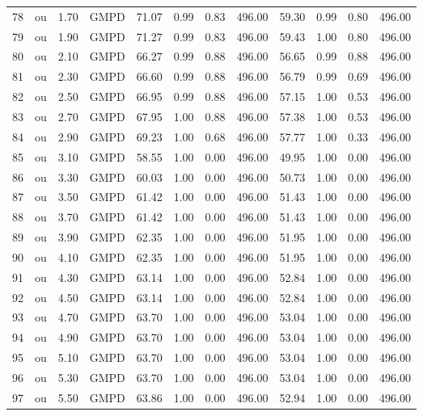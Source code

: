 \begin{table}[ht]
\begin{tabular}{rlrlrrrrrrrr}
  78 & ou & 1.70 & GMPD & 71.07 & 0.99 & 0.83 & 496.00 & 59.30 & 0.99 & 0.80 & 496.00 \\ 
  79 & ou & 1.90 & GMPD & 71.27 & 0.99 & 0.83 & 496.00 & 59.43 & 1.00 & 0.80 & 496.00 \\ 
  80 & ou & 2.10 & GMPD & 66.27 & 0.99 & 0.88 & 496.00 & 56.65 & 0.99 & 0.88 & 496.00 \\ 
  81 & ou & 2.30 & GMPD & 66.60 & 0.99 & 0.88 & 496.00 & 56.79 & 0.99 & 0.69 & 496.00 \\ 
  82 & ou & 2.50 & GMPD & 66.95 & 0.99 & 0.88 & 496.00 & 57.15 & 1.00 & 0.53 & 496.00 \\ 
  83 & ou & 2.70 & GMPD & 67.95 & 1.00 & 0.88 & 496.00 & 57.38 & 1.00 & 0.53 & 496.00 \\ 
  84 & ou & 2.90 & GMPD & 69.23 & 1.00 & 0.68 & 496.00 & 57.77 & 1.00 & 0.33 & 496.00 \\ 
  85 & ou & 3.10 & GMPD & 58.55 & 1.00 & 0.00 & 496.00 & 49.95 & 1.00 & 0.00 & 496.00 \\ 
  86 & ou & 3.30 & GMPD & 60.03 & 1.00 & 0.00 & 496.00 & 50.73 & 1.00 & 0.00 & 496.00 \\ 
  87 & ou & 3.50 & GMPD & 61.42 & 1.00 & 0.00 & 496.00 & 51.43 & 1.00 & 0.00 & 496.00 \\ 
  88 & ou & 3.70 & GMPD & 61.42 & 1.00 & 0.00 & 496.00 & 51.43 & 1.00 & 0.00 & 496.00 \\ 
  89 & ou & 3.90 & GMPD & 62.35 & 1.00 & 0.00 & 496.00 & 51.95 & 1.00 & 0.00 & 496.00 \\ 
  90 & ou & 4.10 & GMPD & 62.35 & 1.00 & 0.00 & 496.00 & 51.95 & 1.00 & 0.00 & 496.00 \\ 
  91 & ou & 4.30 & GMPD & 63.14 & 1.00 & 0.00 & 496.00 & 52.84 & 1.00 & 0.00 & 496.00 \\ 
  92 & ou & 4.50 & GMPD & 63.14 & 1.00 & 0.00 & 496.00 & 52.84 & 1.00 & 0.00 & 496.00 \\ 
  93 & ou & 4.70 & GMPD & 63.70 & 1.00 & 0.00 & 496.00 & 53.04 & 1.00 & 0.00 & 496.00 \\ 
  94 & ou & 4.90 & GMPD & 63.70 & 1.00 & 0.00 & 496.00 & 53.04 & 1.00 & 0.00 & 496.00 \\ 
  95 & ou & 5.10 & GMPD & 63.70 & 1.00 & 0.00 & 496.00 & 53.04 & 1.00 & 0.00 & 496.00 \\ 
  96 & ou & 5.30 & GMPD & 63.70 & 1.00 & 0.00 & 496.00 & 53.04 & 1.00 & 0.00 & 496.00 \\ 
  97 & ou & 5.50 & GMPD & 63.86 & 1.00 & 0.00 & 496.00 & 52.94 & 1.00 & 0.00 & 496.00 \\ 

\end{tabular}
\end{table}
